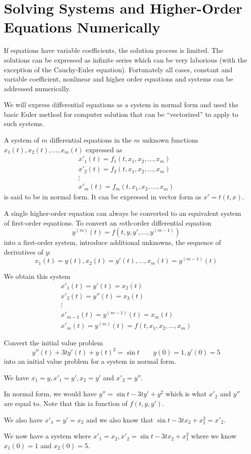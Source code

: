 \documentclass[../diffeq.tex]{subfiles}
\begin{document}
\section{Solving Systems and Higher-Order Equations Numerically}
If equations have variable coefficients, the solution process is limited. The solutions can be expressed as infinite series which can be very laborious (with the exception of the Cauchy-Euler equation).
Fortunately all cases, constant and variable coefficient, nonlinear and higher order equations and systems can be addressed numerically.

We will express differential equations as a system in normal form and used the basic Euler method for computer solution that can be ``vectorized'' to apply to such systems.

A system of $m$ differential equations in the $m$ unknown functions $x_1(t),x_2(t),\dots,x_m(t)$ expressed as 
\begin{align*}
    x'_1(t)=f_1(t,x_1,x_2,\dots, x_m)\\
    x'_2(t)=f_2(t,x_1,x_2,\dots,x_m)\\
    \vdots \\ 
    x'_m(t)=f_m(t,x_1,x_2,\dots,x_m)
\end{align*}
is said to be in normal form. It can be expressed in vector form as $x'=t(t,x)$.

A single higher-order equation can always be converted to an equivalent system of first-order equations. To convert an $m$th-order differential equation 
\[ y^{(m)}(t)=f(t,y,y',\dots,y^{(m-1)}) \]
into a first-order system, introduce additional unknowns, the sequence of derivatives of $y$:
\[ x_1(t)=y(t), x_2(t)=y'(t),\dots, x_m(t)=y^{(m-1)}(t) \]

We obtain this system 
\begin{align*}
    x'_1(t)=y'(t)=x_2(t) \\
    x'_2(t)=y''(t)=x_3(t) \\
    \vdots \\
    x'_{m-1}(t)=y^{(m-1)}(t)=x_m(t) \\
    x'_m(t) = y^{(m)}(t)=f(t,x_1,x_2,\dots,x_m)
\end{align*}

\begin{example}
    Convert the initial value problem 
    \[ y''(t)+3ty'(t)+y(t)^2=\sin t \qquad y(0)=1, y'(0)=5 \]
    into an initial value problem for a system in normal form.

    We have $x_1=y, x'_1=y', x_2 = y'$ and $x'_2=y''$.

    In normal form, we would have $y''=\sin t - 3ty'+y^2$ which is what $x'_2$ and $y''$ are equal to. Note that this ia function of $f(t,y,y')$.

    We also have $x'_1=y'=x_2$ and we also know that $\sin t - 3tx_2+x_1^2 = x'_2$.

    We now have a system where $x'_1=x_2, x'_2=\sin t - 3tx_2+x_1^2$ where we know $x_1(0)=1$ and $x_2(0)=5$.
\end{example}
\end{document}
